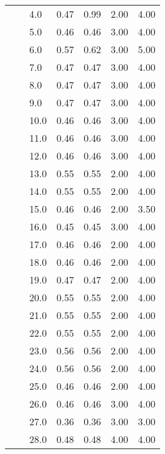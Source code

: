 \begin{tabular}{lllrrrr}
       &     & 4.0  &       0.47 &      0.99 & 2.00 &   4.00 \\
       &     & 5.0  &       0.46 &      0.46 & 3.00 &   4.00 \\
       &     & 6.0  &       0.57 &      0.62 & 3.00 &   5.00 \\
       &     & 7.0  &       0.47 &      0.47 & 3.00 &   4.00 \\
       &     & 8.0  &       0.47 &      0.47 & 3.00 &   4.00 \\
       &     & 9.0  &       0.47 &      0.47 & 3.00 &   4.00 \\
       &     & 10.0 &       0.46 &      0.46 & 3.00 &   4.00 \\
       &     & 11.0 &       0.46 &      0.46 & 3.00 &   4.00 \\
       &     & 12.0 &       0.46 &      0.46 & 3.00 &   4.00 \\
       &     & 13.0 &       0.55 &      0.55 & 2.00 &   4.00 \\
       &     & 14.0 &       0.55 &      0.55 & 2.00 &   4.00 \\
       &     & 15.0 &       0.46 &      0.46 & 2.00 &   3.50 \\
       &     & 16.0 &       0.45 &      0.45 & 3.00 &   4.00 \\
       &     & 17.0 &       0.46 &      0.46 & 2.00 &   4.00 \\
       &     & 18.0 &       0.46 &      0.46 & 2.00 &   4.00 \\
       &     & 19.0 &       0.47 &      0.47 & 2.00 &   4.00 \\
       &     & 20.0 &       0.55 &      0.55 & 2.00 &   4.00 \\
       &     & 21.0 &       0.55 &      0.55 & 2.00 &   4.00 \\
       &     & 22.0 &       0.55 &      0.55 & 2.00 &   4.00 \\
       &     & 23.0 &       0.56 &      0.56 & 2.00 &   4.00 \\
       &     & 24.0 &       0.56 &      0.56 & 2.00 &   4.00 \\
       &     & 25.0 &       0.46 &      0.46 & 2.00 &   4.00 \\
       &     & 26.0 &       0.46 &      0.46 & 3.00 &   4.00 \\
       &     & 27.0 &       0.36 &      0.36 & 3.00 &   3.00 \\
       &     & 28.0 &       0.48 &      0.48 & 4.00 &   4.00 \\

\end{tabular}

